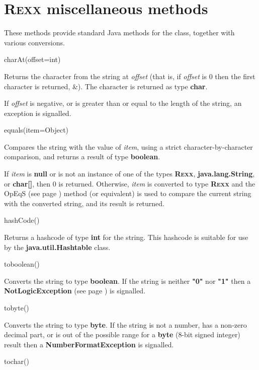 \section{R\textsc{exx} miscellaneous methods}\label{refrexxmis}
 These methods provide standard Java methods for the class, together with
various conversions.
\begin{description}
\item{charAt(offset=int)}

Returns the character from the string at \emph{offset} (that is, if
\emph{offset} is 0 then the first character is returned, \&).
The character is returned as type \textbf{char}.
 
If \emph{offset} is negative, or is greater than or equal to the
length of the string, an exception is signalled.
\item{equals(item=Object)}

Compares the string with the value of \emph{item}, using a strict
character-by-character comparison, and returns a result of
type \textbf{boolean}.
 
If \emph{item} is \textbf{null} or is not an instance of one of
the types \textbf{R\textsc{exx}}, \textbf{java.lang.String}, or \textbf{char[]},
then 0 is returned.
Otherwise, \emph{item} is converted to type \textbf{R\textsc{exx}} and the
 OpEqS (see page \pageref{refopeqs})  method (or equivalent) is used to compare the
current string with the converted string, and its result is returned.
\item{hashCode()}

Returns a hashcode of type \textbf{int} for the string.
This hashcode is suitable for use by the \textbf{java.util.Hashtable}
class.
\item{toboolean()}

Converts the string to type \textbf{boolean}.  If the string is
neither \textbf{"0"} nor \textbf{"1"} then
a  \textbf{NotLogicException} (see page \pageref{refexpnle})  is signalled.
\item{tobyte()}

Converts the string to type \textbf{byte}.  If the string is
not a number, has a non-zero decimal part, or is out of the possible
range for a \textbf{byte} (8-bit signed integer) result then
a \textbf{NumberFormatException} is signalled.
\item{tochar()}


\end{description}
